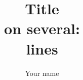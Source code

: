 




\title{\textcolor{titlecolor}{Title \\
on several:\\
lines}}


\author{Your name}








     

